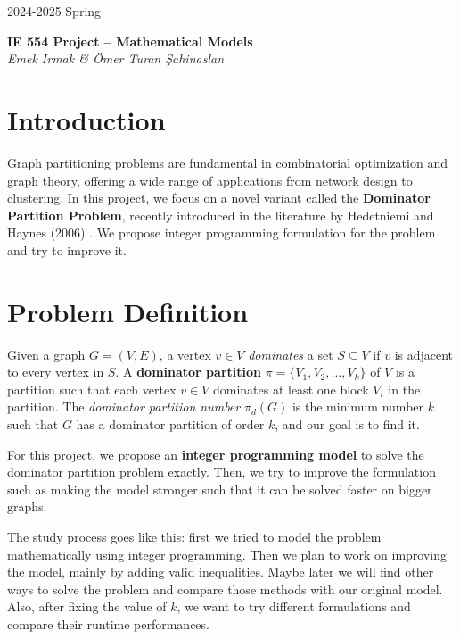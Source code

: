 \documentclass[12pt]{article}
\begin{document}
\begin{tcolorbox}[colback=white, bottomrule=1mm, sharp corners]
    2024-2025 Spring
    \begin{center}
        \Large
        \textbf{IE 554 Project -- Mathematical Models}
        \\[4mm]
        \normalsize
        \hfill \textsl{Emek Irmak \& Ömer Turan Şahinaslan}
    \end{center}
\end{tcolorbox}

\tableofcontents
\clearpage
{}

\section{Introduction}

Graph partitioning problems are fundamental in combinatorial optimization and graph theory, offering a wide range of applications from network design to clustering. In this project, we focus on a novel variant called the \textbf{Dominator Partition Problem}, recently introduced in the literature by Hedetniemi and Haynes (2006) \cite{dominator_partitions}. We propose integer programming formulation for the problem and try to improve it. 

\section{Problem Definition}

Given a graph $G = (V, E)$, a vertex $v \in V$ \textit{dominates} a set $S \subseteq V$ if $v$ is adjacent to every vertex in $S$. A \textbf{dominator partition} $\pi = \{V_1, V_2, \dots, V_k\}$ of $V$ is a partition such that each vertex $v \in V$ dominates at least one block $V_i$ in the partition. The \textit{dominator partition number} $\pi_d(G)$ is the minimum number $k$ such that $G$ has a dominator partition of order $k$, and our goal is to find it.


For this project, we propose an \textbf{integer programming model} to solve the dominator partition problem exactly. Then, we try to improve the formulation such as making the model stronger such that it can be solved faster on bigger graphs.

The study process goes like this: first we tried to model the problem mathematically using integer programming. Then we plan to work on improving the model, mainly by adding valid inequalities. Maybe later we will find other ways to solve the problem and compare those methods with our original model. Also, after fixing the value of $k$, we want to try different formulations and compare their runtime performances.
\end{document}
